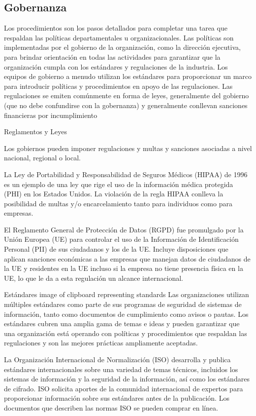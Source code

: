\subsection{Gobernanza}
Los procedimientos son los pasos detallados para completar una tarea que respaldan las políticas departamentales u organizacionales.
Las políticas son implementadas por el gobierno de la organización, como la dirección ejecutiva, para brindar orientación en todas las actividades para garantizar que la organización cumpla con los estándares y regulaciones de la industria.
Los equipos de gobierno a menudo utilizan los estándares para proporcionar un marco para introducir políticas y procedimientos en apoyo de las regulaciones.
Las regulaciones se emiten comúnmente en forma de leyes, generalmente del gobierno (que no debe confundirse con la gobernanza) y generalmente conllevan sanciones financieras por incumplimiento

Reglamentos y Leyes

Los gobiernos pueden imponer regulaciones y multas y sanciones asociadas a nivel nacional, regional o local.


La Ley de Portabilidad y Responsabilidad de Seguros Médicos (HIPAA) de 1996 es un ejemplo de una ley que rige el uso de la información médica protegida (PHI) en los Estados Unidos. La violación de la regla HIPAA conlleva la posibilidad de multas y/o encarcelamiento tanto para individuos como para empresas.

El Reglamento General de Protección de Datos (RGPD) fue promulgado por la Unión Europea (UE) para controlar el uso de la Información de Identificación Personal (PII) de sus ciudadanos y los de la UE. Incluye disposiciones que aplican sanciones económicas a las empresas que manejan datos de ciudadanos de la UE y residentes en la UE incluso si la empresa no tiene presencia física en la UE, lo que le da a esta regulación un alcance internacional.

Estándares
image of clipboard representing standards
Las organizaciones utilizan múltiples estándares como parte de sus programas de seguridad de sistemas de información, tanto como documentos de cumplimiento como avisos o pautas. Los estándares cubren una amplia gama de temas e ideas y pueden garantizar que una organización está operando con políticas y procedimientos que respaldan las regulaciones y son las mejores prácticas ampliamente aceptadas.

La Organización Internacional de Normalización (ISO) desarrolla y publica estándares internacionales sobre una variedad de temas técnicos, incluidos los sistemas de información y la seguridad de la información, así como los estándares de cifrado. ISO solicita aportes de la comunidad internacional de expertos para proporcionar información sobre sus estándares antes de la publicación. Los documentos que describen las normas ISO se pueden comprar en línea.

